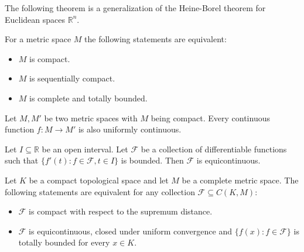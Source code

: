 	The following theorem is a generalization of the Heine-Borel theorem for Euclidean spaces $\mathbb{R}^n$.
	\begin{theorem}
		For a metric space $M$ the following statements are equivalent:
		\begin{itemize}
			\item $M$ is compact.
			\item $M$ is sequentially compact.
			\item $M$ is complete and totally bounded.
		\end{itemize}
	\end{theorem}

	\begin{theorem}
		Let $M, M'$ be two metric spaces with $M$ being compact. Every continuous function $f:M\rightarrow M'$ is also uniformly continuous.
	\end{theorem}



	\begin{property}
		Let $I\subseteq\mathbb{R}$ be an open interval. Let $\mathcal{F}$ be a collection of differentiable functions such that $\{f'(t):f\in\mathcal{F}, t\in I\}$ is bounded. Then $\mathcal{F}$ is equicontinuous.
	\end{property}

	\begin{theorem}
		Let $K$ be a compact topological space and let $M$ be a complete metric space. The following statements are equivalent for any collection $\mathcal{F}\subseteq C(K, M)$:
		\begin{itemize}
			\item $\mathcal{F}$ is compact with respect to the supremum distance\footnotemark.
			\item $\mathcal{F}$ is equicontinuous, closed under uniform convergence and $\{f(x):f\in\mathcal{F}\}$ is totally bounded for every $x\in K$.
		\end{itemize}
	\end{theorem}
